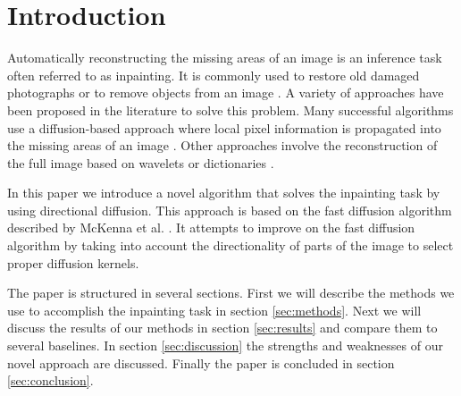 \section{Introduction}
\label{sec:introduction}

Automatically reconstructing the missing areas of an image is an inference task often referred to as inpainting. It is commonly used to restore old damaged photographs or to remove objects from an image \cite{bertalmio2000image}. A variety of approaches have been proposed in the literature to solve this problem. Many successful algorithms use a diffusion-based approach where local pixel information is propagated into the missing areas of an image \cite{alvarez1992image}. Other approaches involve the reconstruction of the full image based on wavelets or dictionaries \cite{cilhaar, cillearned}.

In this paper we introduce a novel algorithm that solves the inpainting task by using  directional diffusion. This approach is based on the fast diffusion algorithm described by McKenna et al. \cite{richard2001fast}. It attempts to improve on the fast diffusion algorithm by taking into account the directionality of parts of the image to select proper diffusion kernels.

The paper is structured in several sections. First we will describe the methods we use to accomplish the inpainting task in section \ref{sec:methods}. Next we will discuss the results of our methods in section \ref{sec:results} and compare them to several baselines. In section \ref{sec:discussion} the strengths and weaknesses of our novel approach are discussed. Finally the paper is concluded in section \ref{sec:conclusion}.
